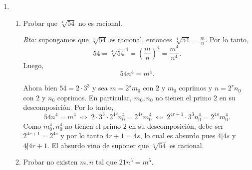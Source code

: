 \documentclass[a4paper,12pt,twoside,spanish,reqno]{amsbook}
\numberwithin{equation}{section}
\newcommand{\rta}{\noindent\textit{Rta: }}
\begin{document}
\begin{enumerate}
\begin{enumerate}
    \rta Como en el ejercicio anterior debemos ver que $15m^2 = n^2$ nos lleva a un absurdo. Ahora bien si $m = 5^rm_1$ y $n = 5^sn_1$ con $5$ coprimo con $m_1$ y $n_1$, tenemos que  $5^{2r+1}3m_1 =   5^{2s}n_1^2 \Rightarrow 2r+1 = 2s$, absurdo.
    \item Probar  que $\sqrt{8}$ no es un número racional.     
    
    \rta En  este caso  suponemos que $\sqrt{8} =n/m$, luego $ 8m^2 = n^2$. Si $m = 2^rm_1$ y $n = 2^sn_1$ con $(2,m_1) = (2,n_1) = 1$, tenemos  que $2^3 \cdot 2^{2r} m_1^2 = 2^{2s}n_1^2$, por lo tanto $2^{2r+3} m_1^2 = 2^{2s}n_1^2$. Luego $2r+3 = 2s$ lo cual es absurdo pues un impar no puede ser igual a un par.  
    \item Probar  que $\sqrt[3]{4}$ no es un número racional.     
    
    \rta Si fuera racional tendríamos $\sqrt[3]{4} = n/m$ y  por lo tanto (elevando al cubo) $4 =n^3/m^3$, o equivalentemente,   $2^2m^3 = n^3$. Si $m = 2^rm_1$ y $n = 2^sn_1$ con $(2,m_1) = (2,n_1) = 1$, tenemos  $2^2m^3 = 2^2\cdot 2^{3r}m_1^3 =2^{3r+2}m_1^3$ y      $n^3 =2^{3s}n_1^3 $. Por  lo tanto  $3r+2 = 3s$ lo cual es absurdo, pues $3r+2$ no es múltiplo de 3 y $3s$ sí lo es.
\end{enumerate}


\item  
\begin{enumerate}
    \item Probar  que $\sqrt[4]{54}$ no es racional. 
    
    \rta supongamos que  $\sqrt[4]{54}$ es racional, entonces  $\sqrt[4]{54} = \frac{m}{n}$. Por lo tanto,
    $$
    54 = \sqrt[4]{54}^4 = \left(\frac{m}{n}\right)^4 = \frac{m^4}{n^4}.
    $$
    Luego,
    $$
    54 n^4 = m^4. 
    $$ 

    Ahora bien $54 = 2 \cdot 3^3$ y sea $m = 2^s m_0$ con $2$ y $m_0$ coprimos y $n = 2^r n_0$ con $2$ y $n_0$ coprimos. En particular, $m_0,n_0$  no tienen el primo $2$  en su descomposición. Por lo tanto, 
    $$
    54 n^4 = m^4  \;\Leftrightarrow\;   2 \cdot 3^3 \cdot 2^{4r} n_0^4 = 2^{4s} m_0^4
    \;\Leftrightarrow\;  2^{4r+1} \cdot 3^3  n_0^4 = 2^{4s} m_0^4.
    $$ 
    Como  $m_0^4,n_0^4$  no tienen el primo $2$  en su descomposición,  debe ser $2^{4r+1} = 2^{4s}$ y por lo tanto $4r+1 = 4s$, lo cual es absurdo pues $4 | 4s$ y $4 \not| 4r+1$. El absurdo vino de suponer que $\sqrt[4]{54}$ es racional. 

    \item Probar no existen $m, n$ tal que $21 n^5 = m^5$. 
    

\end{enumerate}
\end{enumerate}
\end{document}
